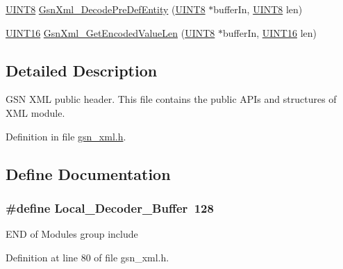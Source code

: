 \begin{DoxyCompactItemize}
\item 
\hyperlink{a00660_gab27e9918b538ce9d8ca692479b375b6a}{UINT8} \hyperlink{a00616_a2e812d6ec943c8265a66a5273d1821ea}{GsnXml\_\-DecodePreDefEntity} (\hyperlink{a00660_gab27e9918b538ce9d8ca692479b375b6a}{UINT8} $\ast$bufferIn, \hyperlink{a00660_gab27e9918b538ce9d8ca692479b375b6a}{UINT8} len)
\item 
\hyperlink{a00660_ga09f1a1fb2293e33483cc8d44aefb1eb1}{UINT16} \hyperlink{a00616_ae9419a52a2ce213dcaec7517e1d5b532}{GsnXml\_\-GetEncodedValueLen} (\hyperlink{a00660_gab27e9918b538ce9d8ca692479b375b6a}{UINT8} $\ast$bufferIn, \hyperlink{a00660_ga09f1a1fb2293e33483cc8d44aefb1eb1}{UINT16} len)
\end{DoxyCompactItemize}


\subsection{Detailed Description}
GSN XML public header. This file contains the public APIs and structures of XML module. 

Definition in file \hyperlink{a00616_source}{gsn\_\-xml.h}.



\subsection{Define Documentation}
\hypertarget{a00616_a32c1a252fccb70a1e2b8824f282a30ef}{
\subsubsection[{Local\_\-Decoder\_\-Buffer}]{\setlength{\rightskip}{0pt plus 5cm}\#define Local\_\-Decoder\_\-Buffer~128}}
\label{a00616_a32c1a252fccb70a1e2b8824f282a30ef}
END of Modules group include 

Definition at line 80 of file gsn\_\-xml.h.



